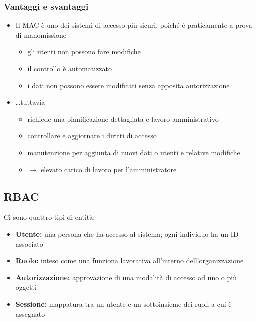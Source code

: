 \subsubsection{Vantaggi e svantaggi}
\begin{itemize}
    \item Il MAC è uno dei sistemi di accesso più sicuri, poiché è praticamente a prova di manomissione
    \begin{itemize}
        \item gli utenti non possono fare modifiche 
        \item il controllo è automatizzato 
        \item i dati non possono essere modificati senza apposita autorizzazione 
    \end{itemize}
    \item \dots tuttavia 
    \begin{itemize}
        \item richiede una pianificazione dettagliata e lavoro amministrativo
        \item controllare e aggiornare i diritti di accesso 
        \item manutenzione per aggiunta di nuovi dati o utenti e relative modifiche 
        \item $\rightarrow$ elevato carico di lavoro per l'amministratore
    \end{itemize}
\end{itemize}

\subsection{RBAC}
Ci sono quattro tipi di entità:
\begin{itemize}
    \item \textbf{Utente:} una persona che ha accesso al sistema; ogni individuo 
    ha un ID associato 
    \item \textbf{Ruolo:} inteso come una funziona lavorativa all'interno dell'organizzazione
    \item \textbf{Autorizzazione:} approvazione di una modalità di accesso ad uno o più oggetti 
    \item \textbf{Sessione:} mappatura tra un utente e un sottoinsieme dei ruoli a cui è assegnato
\end{itemize}


